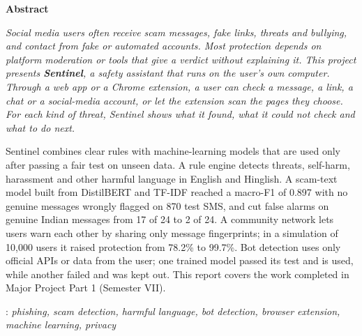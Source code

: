 \newpage
\thispagestyle{plain}
\begin{center}
\textbf {{\Large Abstract}} \\
\vspace{2pc}
\end{center}
\onehalfspacing
{\itshape
\noindent Social media users often receive scam messages, fake links, threats and bullying, and contact from fake or automated accounts. Most protection depends on platform moderation or tools that give a verdict without explaining it. This project presents \textbf{Sentinel}, a safety assistant that runs on the user's own computer. Through a web app or a Chrome extension, a user can check a message, a link, a chat or a social-media account, or let the extension scan the pages they choose. For each kind of threat, Sentinel shows what it found, what it could not check and what to do next.

\vspace{0.5pc}
\noindent Sentinel combines clear rules with machine-learning models that are used only after passing a fair test on unseen data. A rule engine detects threats, self-harm, harassment and other harmful language in English and Hinglish. A scam-text model built from DistilBERT and TF-IDF reached a macro-F1 of 0.897 with no genuine messages wrongly flagged on 870 test SMS, and cut false alarms on genuine Indian messages from 17 of 24 to 2 of 24. A community network lets users warn each other by sharing only message fingerprints; in a simulation of 10,000 users it raised protection from 78.2\% to 99.7\%. Bot detection uses only official APIs or data from the user; one trained model passed its test and is used, while another failed and was kept out. This report covers the work completed in Major Project Part 1 (Semester VII).
}

\vspace{1pc}
: {\it phishing, scam detection, harmful language, bot detection, browser extension, machine learning, privacy}
